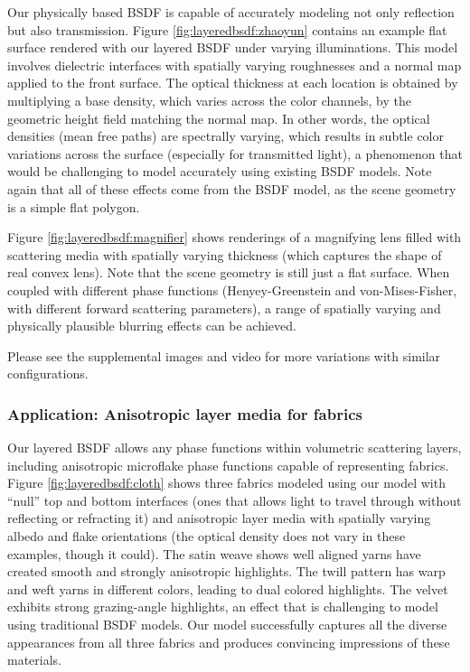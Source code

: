 Our physically based BSDF is capable of accurately modeling not only reflection but also transmission.
Figure \ref{fig:layeredbsdf:zhaoyun} contains an example flat surface rendered with our layered BSDF under varying illuminations.
This model involves dielectric interfaces with spatially varying roughnesses and a normal map applied to the front surface.
The optical thickness at each location is obtained by multiplying a base density, which varies across the color channels, by the geometric height field matching the normal map.
In other words, the optical densities (mean free paths) are spectrally varying, which results in subtle color variations across the surface (especially for transmitted light), a phenomenon that would be challenging to model accurately using existing BSDF models. Note again that all of these effects come from the BSDF model, as the scene geometry is a simple flat polygon.




Figure \ref{fig:layeredbsdf:magnifier} shows renderings of a magnifying lens filled with scattering media with spatially varying thickness (which captures the shape of real convex lens). Note that the scene geometry is still just a flat surface.
When coupled with different phase functions (Henyey-Greenstein and von-Mises-Fisher, with different forward scattering parameters), a range of spatially varying and physically plausible blurring effects can be achieved.

Please see the supplemental images and video for more variations with similar configurations.

\subsubsection{Application: Anisotropic layer media for fabrics}

Our layered BSDF allows any phase functions within volumetric scattering layers, including anisotropic microflake phase functions \cite{jakob2010radiative,zhao2011building,heitz2015sggx} capable of representing fabrics.
Figure \ref{fig:layeredbsdf:cloth} shows three fabrics modeled using our model with ``null'' top and bottom interfaces (ones that allows light to travel through without reflecting or refracting it) and anisotropic layer media with spatially varying albedo and flake orientations (the optical density does not vary in these examples, though it could).
The satin weave shows well aligned yarns have created smooth and strongly anisotropic highlights. The twill pattern has warp and weft yarns in different colors, leading to dual colored highlights. The velvet exhibits strong grazing-angle highlights, an effect that is challenging to model using traditional BSDF models. Our model successfully captures all the diverse appearances from all three fabrics and produces convincing impressions of these materials.

